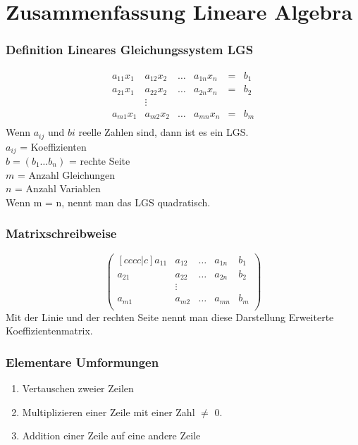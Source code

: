 \documentclass[10pt]{scrartcl}
\begin{document}
\section*{Zusammenfassung Lineare Algebra}
\begin{multicols}{2}
\subsubsection*{Definition Lineares Gleichungssystem LGS}
\begin{equation}
\begin{matrix}
a_{11}x_{1} & a_{12}x_{2} & \dots & a_{1n}x_{n} & = & b_{1} \\
a_{21}x_{1} & a_{22}x_{2} & \dots & a_{2n}x_{n} & = & b_{2} \\
& \vdots\\
a_{m1}x_{1} & a_{m2}x_{2} & \dots & a_{mn}x_{n} & = & b_{m} \\
\end{matrix}
\end{equation}
Wenn $ a_{ij} $ und $b{i}$ reelle Zahlen sind, dann ist es ein LGS.\\
$ a_{ij} $ = Koeffizienten\\
$ b = (b_{1} \dots b_{n}) $ = rechte Seite\\
$m$ = Anzahl Gleichungen\\
$n$ = Anzahl Variablen\\
Wenn m = n, nennt man das LGS quadratisch.\\
\subsubsection*{Matrixschreibweise}
\begin{equation}
\begin{pmatrix}[cccc|c]
a_{11} & a_{12} & \dots & a_{1n} & b_{1} \\
a_{21} & a_{22} & \dots & a_{2n} & b_{2} \\
& \vdots & & &\\
a_{m1} & a_{m2} & \dots & a_{mn} & b_{m} \\
\end{pmatrix}
\end{equation}
Mit der Linie und der rechten Seite nennt man diese Darstellung Erweiterte Koeffizientenmatrix.
\subsubsection*{Elementare Umformungen}
\begin{enumerate}
\item Vertauschen zweier Zeilen
\item Multiplizieren einer Zeile mit einer Zahl $\neq$ 0.
\item Addition einer Zeile auf eine andere Zeile
\end{enumerate}

\end{multicols}
\end{document}
